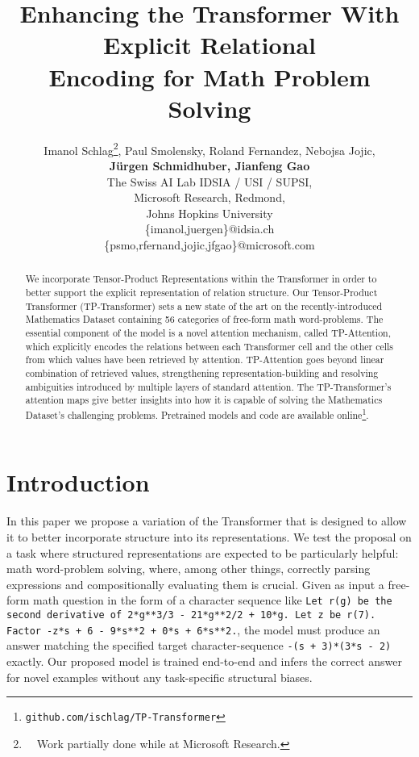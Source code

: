 \documentclass[11pt,a4paper]{article}
\title{Enhancing the Transformer With Explicit Relational \\ Encoding for Math Problem Solving}
\author{
Imanol Schlag\thanks{\ \ Work partially done while at Microsoft Research.},
Paul Smolensky,
Roland Fernandez,
Nebojsa Jojic,\\
\textbf{
J\"urgen Schmidhuber,
Jianfeng Gao
}
\\
 The Swiss AI Lab IDSIA / USI / SUPSI,\\
 Microsoft Research, Redmond,\\
 Johns Hopkins University
\\
\{imanol,juergen\}@idsia.ch \\
\{psmo,rfernand,jojic,jfgao\}@microsoft.com
}
\date{}
\begin{document}
\maketitle
\begin{abstract}
We incorporate Tensor-Product Representations within the Transformer in order to better support the explicit representation of relation structure. 
Our Tensor-Product Transformer (TP-Transformer) sets a new state of the art on the recently-introduced Mathematics Dataset containing 56 categories of free-form math word-problems. 
The essential component of the model is a novel attention mechanism, called TP-Attention, which explicitly encodes the relations between each Transformer cell and the other cells from which values have been retrieved by attention. 
TP-Attention goes beyond linear combination of retrieved values, strengthening representation-building and resolving ambiguities introduced by multiple layers of standard attention. 
The TP-Transformer's attention maps give better insights into how it is capable of solving the Mathematics Dataset's challenging problems. 
Pretrained models and code are available online\footnote{\texttt{github.com/ischlag/TP-Transformer}}.
\end{abstract}

\section{Introduction} \label{sec:Intro}
In this paper we propose a variation of the Transformer \citep{vaswani2017attention} that is designed to allow it to better incorporate structure into its representations. 
We test the proposal on a task where structured representations are expected to be particularly helpful: math word-problem solving, where, among other things, correctly parsing expressions and compositionally evaluating them is crucial.
Given as input a free-form math question in the form of a character sequence like \texttt{Let r(g) be the second derivative of 2*g**3/3 - 21*g**2/2 + 10*g. Let z be r(7). Factor -z*s + 6 - 9*s**2 + 0*s + 6*s**2.}, the model must produce an answer matching the specified target character-sequence \texttt{-(s + 3)*(3*s - 2)} exactly.
Our proposed model is trained end-to-end and infers the correct answer for novel examples without any task-specific structural biases. 
\end{document}
